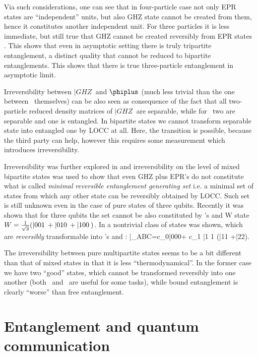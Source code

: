 \documentclass[rmp,12pt,preprint]{revtex4-2}
\begin{document}
Via such considerations, one can see that in four-particle case not
only EPR states are ``independent'' units, but also GHZ state cannot
be created from them, hence it constitutes another independent unit.
For three particles it is less immediate, but still true that GHZ
cannot be created reversibly from EPR states \cite{LPSW1999}. This
shows that even in asymptotic setting there is truly tripartite
entanglement, a distinct quality that cannot be reduced to bipartite
entanglements.  This shows that there is true three-particle
entanglement in asymptotic limit.

Irreversibility between $|GHZ\>$  and $\phiplus$ (much less trivial than the one between \eprstates\
themselves) can be also seen as consequence of
the fact that all two-particle reduced density matrices of $|GHZ\>$ are separable,
while for \eprstates\ two are separable and one is entangled.
In bipartite states we cannot transform separable state into entangled one by LOCC
at all. Here, the transition is possible, because the third party can help,
however this requires some measurement which introduces irreversibility.

Irreversibility was further explored in \cite{AcinVC-mregs}
and irreversibility on the level of mixed bipartite states was used
to show that even GHZ plus EPR's do not constitute what is called
{\it minimal reversible entanglement generating set}
\cite{BPRST-mregs} i.e. a minimal set of states from which any other
state can be reversibly obtained  by LOCC. Such set is still unknown
even in the case of pure states of three qubits. Recently it was
shown \cite{IshizakaP-asym} that for three qubits the set cannot be
also constituted by \epr's and W state $W={1\over \sqrt3}(|001\>
+|010\>+|100\>)$. In \cite{VidalDC2000-epr-ghz} a nontrivial class
of states was shown, which are {\it reversibly} transformable into
\epr's and \ghz:
\be |\psi\>_{ABC}=c_0|000\>+ c_1 |1\> {1\over
{}}(|11\> +|22\>). \ee

The irreversibility between pure multipartite states seems to be a
bit different than that of mixed states in that it is less
``thermodynamical''. In the former case we have two ``good'' states,
which cannot be transformed reversibly into one another (both \eprstate\
and \ghzstate\ are useful for some tasks), while bound entanglement is
clearly ``worse'' than free entanglement.


\section{Entanglement and quantum communication \label{sec:communication}}
\end{document}
